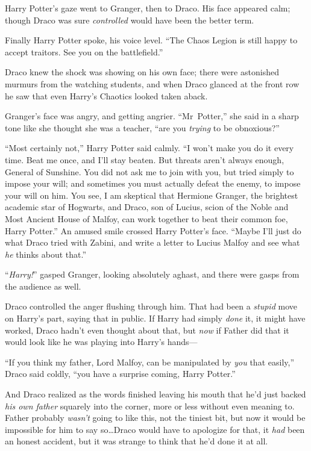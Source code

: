 Harry Potter’s gaze went to Granger, then to Draco. His face appeared calm; though Draco was sure \emph{controlled} would have been the better term.

Finally Harry Potter spoke, his voice level. “The Chaos Legion is still happy to accept traitors. See you on the battlefield.”

Draco knew the shock was showing on his own face; there were astonished murmurs from the watching students, and when Draco glanced at the front row he saw that even Harry’s Chaotics looked taken aback.

Granger’s face was angry, and getting angrier. “Mr~Potter,” she said in a sharp tone like she thought she was a teacher, “are you \emph{trying} to be obnoxious?”

“Most certainly not,” Harry Potter said calmly. “I won’t make you do it every time. Beat me once, and I’ll stay beaten. But threats aren’t always enough, General of Sunshine. You did not ask me to join with you, but tried simply to impose your will; and sometimes you must actually defeat the enemy, to impose your will on him. You see, I am skeptical that Hermione Granger, the brightest academic star of Hogwarts, and Draco, son of Lucius, scion of the Noble and Most Ancient House of Malfoy, can work together to beat their common foe, Harry Potter.” An amused smile crossed Harry Potter’s face. “Maybe I’ll just do what Draco tried with Zabini, and write a letter to Lucius Malfoy and see what \emph{he} thinks about that.”

“\emph{Harry!}” gasped Granger, looking absolutely aghast, and there were gasps from the audience as well.

Draco controlled the anger flushing through him. That had been a \emph{stupid} move on Harry’s part, saying that in public. If Harry had simply \emph{done} it, it might have worked, Draco hadn’t even thought about that, but \emph{now} if Father did that it would look like he was playing into Harry’s hands—

“If you think my father, Lord Malfoy, can be manipulated by \emph{you} that easily,” Draco said coldly, “you have a surprise coming, Harry Potter.”

And Draco realized as the words finished leaving his mouth that he’d just backed \emph{his own father} squarely into the corner, more or less without even meaning to. Father probably \emph{wasn’t} going to like this, not the tiniest bit, but now it would be impossible for him to say so…Draco would have to apologize for that, it \emph{had} been an honest accident, but it was strange to think that he’d done it at all.

